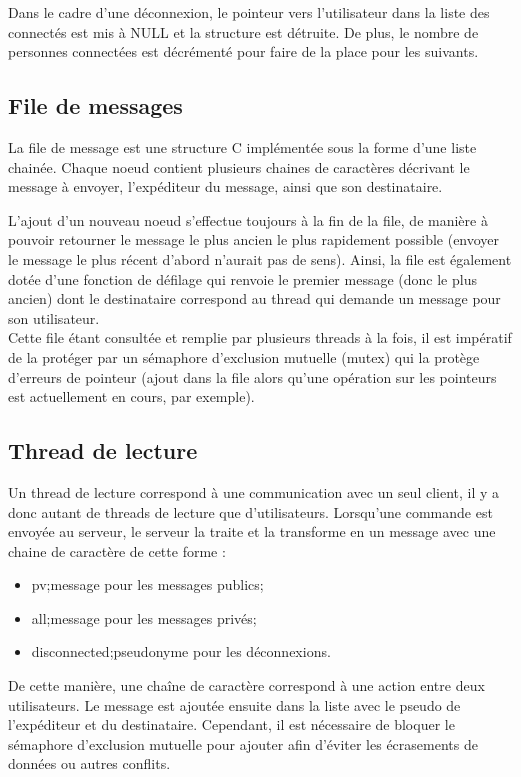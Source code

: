 			Dans le cadre d'une déconnexion, le pointeur vers l'utilisateur dans la liste des connectés est mis à NULL et la structure est détruite. De plus, le nombre de personnes connectées est décrémenté pour faire de la place pour les suivants.
			
		\subsection{File de messages}
			La file de message est une structure C implémentée sous la forme d'une liste chainée. Chaque noeud contient plusieurs chaines de caractères décrivant le message à envoyer, l'expéditeur du message, ainsi que son destinataire.
			
			L'ajout d'un nouveau noeud s'effectue toujours à la fin de la file, de manière à pouvoir retourner le message le plus ancien le plus rapidement possible (envoyer le message le plus récent d'abord n'aurait pas de sens). Ainsi, la file est également dotée d'une fonction de défilage qui renvoie le premier message (donc le plus ancien) dont le destinataire correspond au thread qui demande un message pour son utilisateur.\\
			
			Cette file étant consultée et remplie par plusieurs threads à la fois, il est impératif de la protéger par un sémaphore d'exclusion mutuelle (mutex) qui la protège d'erreurs de pointeur (ajout dans la file alors qu'une opération sur les pointeurs est actuellement en cours, par exemple).
			
		\subsection{Thread de lecture}
			Un thread de lecture correspond à une communication avec un seul client, il y a donc autant de threads de lecture que d'utilisateurs. Lorsqu'une commande est envoyée au serveur, le serveur la traite et la transforme en un message avec une chaine de caractère de cette forme :
			\begin{itemize}
				\item \og pv;message \fg pour les messages publics;
				\item \og all;message \fg pour les messages privés;
				\item \og disconnected;pseudonyme \fg pour les déconnexions.
			\end{itemize}
			
			De cette manière, une chaîne de caractère correspond à une action entre deux utilisateurs. Le message est ajoutée ensuite dans la liste avec le pseudo de l'expéditeur et du destinataire. Cependant, il est nécessaire de bloquer le sémaphore d'exclusion mutuelle pour ajouter afin d'éviter les écrasements de données ou autres conflits. 
			
